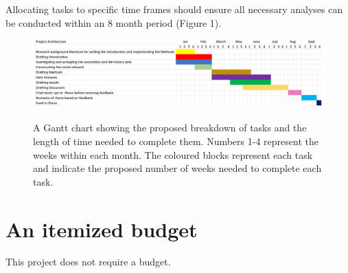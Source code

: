 \documentclass[titlepage]{article}
\begin{document}
Allocating tasks to specific time frames should ensure all necessary analyses can be conducted within an 8 month period (Figure 1). 

 \begin{figure}[H] 
  \centering
  \includegraphics[scale=0.15] {Gantt.png}
   \label{Figure 1}
    \caption{\footnotesize A Gantt chart showing the proposed breakdown of tasks and the length of time needed to complete them.  Numbers 1-4 represent the weeks within each month. The coloured blocks represent each task and indicate the proposed number of weeks needed to complete each task.} 
\end{figure}







 \section{An itemized budget} 

This project does not require a budget. 





\end{document}
